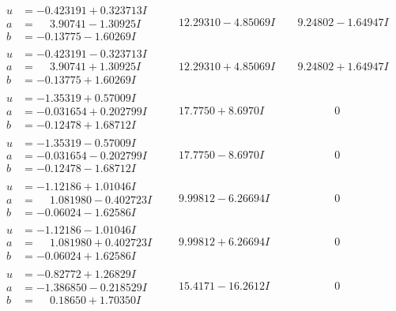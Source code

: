 \documentclass[1p]{elsarticle_modified}
\theoremstyle{definition}
\begin{document}
$$\begin{array}{c|c|c}
\begin{aligned}
u &= -0.423191 + 0.323713 I \\
a &= \phantom{-}3.90741 - 1.30925 I \\
b &= -0.13775 - 1.60269 I\end{aligned}
 & \phantom{-}12.29310 - 4.85069 I & \phantom{-}9.24802 - 1.64947 I \\ \hline\begin{aligned}
u &= -0.423191 - 0.323713 I \\
a &= \phantom{-}3.90741 + 1.30925 I \\
b &= -0.13775 + 1.60269 I\end{aligned}
 & \phantom{-}12.29310 + 4.85069 I & \phantom{-}9.24802 + 1.64947 I \\ \hline\begin{aligned}
u &= -1.35319 + 0.57009 I \\
a &= -0.031654 + 0.202799 I \\
b &= -0.12478 + 1.68712 I\end{aligned}
 & \phantom{-}17.7750 + 8.6970 I & \phantom{-0.000000 } 0 \\ \hline\begin{aligned}
u &= -1.35319 - 0.57009 I \\
a &= -0.031654 - 0.202799 I \\
b &= -0.12478 - 1.68712 I\end{aligned}
 & \phantom{-}17.7750 - 8.6970 I & \phantom{-0.000000 } 0 \\ \hline\begin{aligned}
u &= -1.12186 + 1.01046 I \\
a &= \phantom{-}1.081980 - 0.402723 I \\
b &= -0.06024 - 1.62586 I\end{aligned}
 & \phantom{-}9.99812 - 6.26694 I & \phantom{-0.000000 } 0 \\ \hline\begin{aligned}
u &= -1.12186 - 1.01046 I \\
a &= \phantom{-}1.081980 + 0.402723 I \\
b &= -0.06024 + 1.62586 I\end{aligned}
 & \phantom{-}9.99812 + 6.26694 I & \phantom{-0.000000 } 0 \\ \hline\begin{aligned}
u &= -0.82772 + 1.26829 I \\
a &= -1.386850 - 0.218529 I \\
b &= \phantom{-}0.18650 + 1.70350 I\end{aligned}
 & \phantom{-}15.4171 - 16.2612 I & \phantom{-0.000000 } 0 \\ \hline\begin{aligned}

\end{aligned}
\end{array}$$
\end{document}
